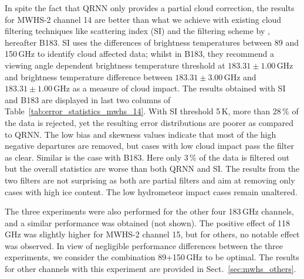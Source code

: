 \documentclass[amt, manuscript]{copernicus}
\begin{document}
In spite the fact that QRNN only provides a partial cloud correction, the results for  MWHS-2 channel 14 are better than what we achieve with existing cloud filtering techniques like scattering index (SI) and the filtering scheme by \citet{buehler:aclou:07}, hereafter B183. SI uses the differences of brightness temperatures between 89 and 150\,GHz to identify cloud affected data; whilst in B183, they recommend a viewing angle dependent brightness temperature threshold at $183.31\pm1.00$\,GHz and brightness temperature difference between $183.31\pm3.00$\,GHz and $183.31\pm 1.00$\,GHz as a measure of cloud impact. The results obtained with SI and B183 are displayed in last two columns of Table~\ref{tab:error_statistics_mwhs_14}. With SI threshold 5\,K, more than 28\,\% of the data is rejected, yet the resulting error distributions are poorer as compared to QRNN. The low bias and skewness values indicate that most of the high negative departures are removed, but cases with low cloud impact pass the filter as clear. Similar is the case with B183. Here only 3\,\% of the data is filtered out but the overall statistics are worse than both QRNN and SI. The results from the two filters are not surprising as both are partial filters and aim at removing only cases with high ice content. The low hydrometeor impact cases remain unaltered.

The three experiments were also performed for the other four 183\,GHz channels, and a similar performance was obtained (not shown). The positive effect of 118\,GHz was slightly higher for MWHS-2 channel 15, but for others, no notable effect was observed. In view of negligible performance differences between the three experiments, we consider the combination 89+150\,GHz to be optimal. The results for other channels with this experiment are provided in Sect.~\ref{sec:mwhs_others}. 
\end{document}
